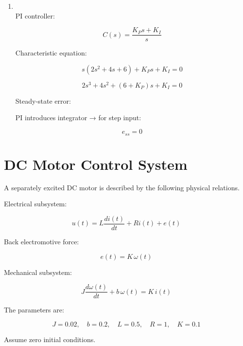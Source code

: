 \documentclass[a4paper,12pt]{article}
\begin{document}
\begin{enumerate}
\item[(f)]~\\

PI controller:

\[
C(s)=\frac{K_P s+K_I}{s}
\]

Characteristic equation:

\[
s(2s^2+4s+6)+K_P s+K_I=0
\]

\[
2s^3+4s^2+(6+K_P)s+K_I=0
\]

Steady-state error:

PI introduces integrator → for step input:

\[
e_{ss}=0
\]

\end{enumerate}

\fi


\section{DC Motor Control System}

A separately excited DC motor is described by the following physical relations.

Electrical subsystem:

\[
u(t) = L\frac{di(t)}{dt} + Ri(t) + e(t)
\]

Back electromotive force:

\[
e(t) = K\,\omega(t)
\]

Mechanical subsystem:

\[
J\frac{d\omega(t)}{dt} + b\,\omega(t) = K\,i(t)
\]

The parameters are:

\[
J=0.02,\quad b=0.2,\quad L=0.5,\quad R=1,\quad K=0.1
\]

Assume zero initial conditions.
\end{document}
